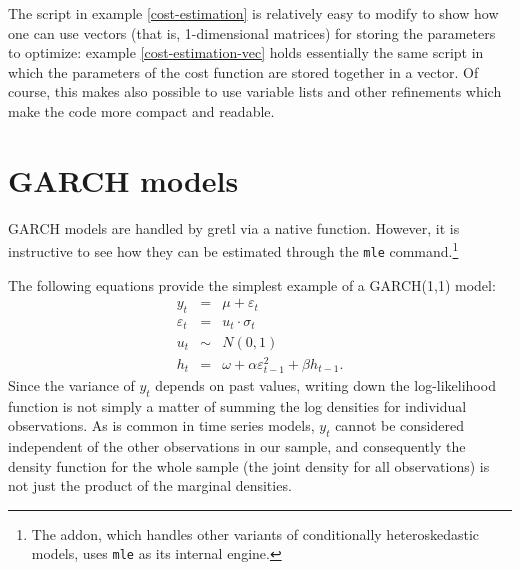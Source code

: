 The script in example \ref{cost-estimation} is relatively easy to
modify to show how one can use vectors (that is, 1-dimensional
matrices) for storing the parameters to optimize: example
\ref{cost-estimation-vec} holds essentially the same script in which
the parameters of the cost function are stored together in a
vector. Of course, this makes also possible to use variable lists and
other refinements which make the code more compact and readable.

\begin{script}[htbp]
  \label{cost-estimation-vec}
\end{script}

\section{GARCH models}
\label{sec:garch}

GARCH models are handled by gretl via a native function. However, it is
instructive to see how they can be estimated through the \texttt{mle}
command.\footnote{The  addon, which handles other variants
of conditionally heteroskedastic models, uses \texttt{mle} as its
internal engine.}

The following equations provide the simplest example of a GARCH(1,1)
model:
\begin{eqnarray*}
  y_t & = & \mu + \varepsilon_t \\
  \varepsilon_t & = & u_t \cdot \sigma_t \\
  u_t & \sim & N(0,1) \\
  h_t & = & \omega + \alpha \varepsilon^2_{t-1} + \beta h_{t-1}.
\end{eqnarray*}
Since the variance of $y_t$ depends on past values, writing down the
log-likelihood function is not simply a matter of summing the log
densities for individual observations. As is common in time series
models, $y_t$ cannot be considered independent of the other
observations in our sample, and consequently the density function for
the whole sample (the joint density for all observations) is not just
the product of the marginal densities.


